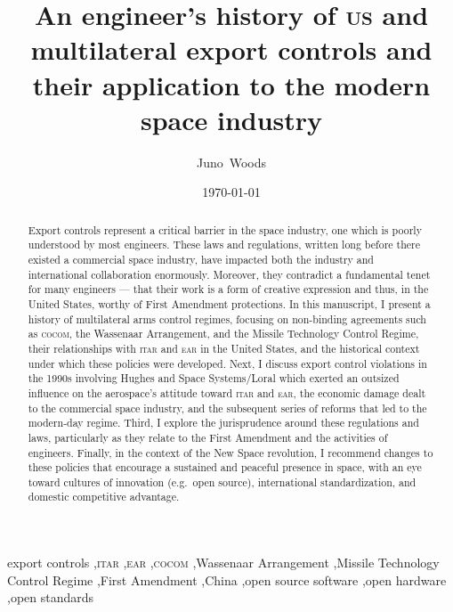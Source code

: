 \documentclass[preprint,twocolumn,5p]{elsarticle}
\date{\today}
\begin{document}
\title{An engineer's history of \textsc{us} and multilateral export controls and their application to the modern space industry}

\author{Juno~Woods}
\address{Open Lunar Foundation, 399 Webster Street, San Francisco, \textsc{ca} 94117, United States}


\begin{abstract}
Export controls represent a critical barrier in the space industry, one which is poorly understood by most engineers. These laws and regulations, written long before there existed a commercial space industry, have impacted both the industry and international collaboration enormously. Moreover, they contradict a fundamental tenet for many engineers --- that their work is a form of creative expression and thus, in the United States, worthy of First Amendment protections. In this manuscript, I present a history of multilateral arms control regimes, focusing on non-binding agreements such as \textsc{cocom}, the Wassenaar Arrangement, and the Missile Technology Control Regime, their relationships with \textsc{itar} and \textsc{ear} in the United States, and the historical context under which these policies were developed. Next, I discuss export control violations in the 1990s involving Hughes and Space Systems/Loral which exerted an outsized influence on the aerospace's attitude toward \textsc{itar} and \textsc{ear}, the economic damage dealt to the commercial space industry, and the subsequent series of reforms that led to the modern-day regime. Third, I explore the jurisprudence around these regulations and laws, particularly as they relate to the First Amendment and the activities of engineers. Finally, in the context of the New Space revolution, I recommend changes to these policies that encourage a sustained and peaceful presence in space, with an eye toward cultures of innovation (e.g.\ open source), international standardization, and domestic competitive advantage.
\end{abstract}

\begin{keyword}
export controls \sep \textsc{itar} \sep \textsc{ear} \sep \textsc{cocom} \sep Wassenaar Arrangement \sep Missile Technology Control Regime \sep First Amendment \sep China \sep open source software \sep open hardware \sep open standards
\end{keyword}
\end{document}
